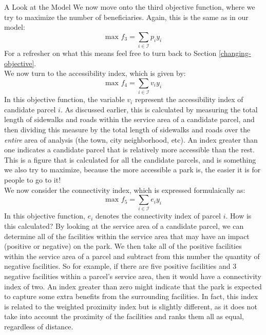 \documentclass[12pt]{pom_thesis}
\theoremstyle{definition}
\begin{document}
\begin{chapter}{A Look at the Model}
We now move onto the third objective function, where we try to maximize the number of beneficiaries. Again, this is the same as in our model:
\begin{equation} \label{objective-3}
\textrm{max } f_3 = \sum_{i \in \mathcal{I}} p_iy_i
\end{equation}
For a refresher on what this means feel free to turn back to Section \ref{changing-objective}. \\

We now turn to the accessibility index, which is given by:
\begin{equation} \label{objective-4}
\textrm{max } f_4 = \sum_{i \in \mathcal{I}} v_iy_i
\end{equation}
In this objective function, the variable $v_i$ represent the accessibility index of candidate parcel $i$. As discussed earlier, this is calculated by measuring the total length of sidewalks and roads within the service area of a candidate parcel, and then dividing this measure by the total length of sidewalks and roads over the \textit{entire} area of analysis (the town, city neighborhood, etc). An index greater than one indicates a candidate parcel that is relatively more accessible than the rest.  This is a figure that is calculated for all the candidate parcels, and is something we also try to maximize, because the more accessible a park is, the easier it is for people to go to it! \\

We now consider the connectivity index, which is expressed formulaically as:
\begin{equation} \label{objective-5}
\textrm{max } f_5 = \sum_{i \in \mathcal{I}} e_iy_i
\end{equation}
In this objective function, $e_i$ denotes the connectivity index of parcel $i$. How is this calculated? By looking at the service area of a candidate parcel, we can determine all of the facilities within the service area that may have an impact (positive or negative) on the park. We then take all of the positive facilities within the service area of a parcel and subtract from this number the quantity of negative facilities. So for example, if there are five positive facilities and 3 negative facilities within a parcel's service area, then it would have a connectivity index of two. An index greater than zero might indicate that the park is expected to capture some extra benefits from the surrounding facilities. In fact, this index is related to the weighted proximity index but is slightly different, as it does not take into account the proximity of the facilities and ranks them all as equal, regardless of distance. \\


\end{chapter}
\end{document}
